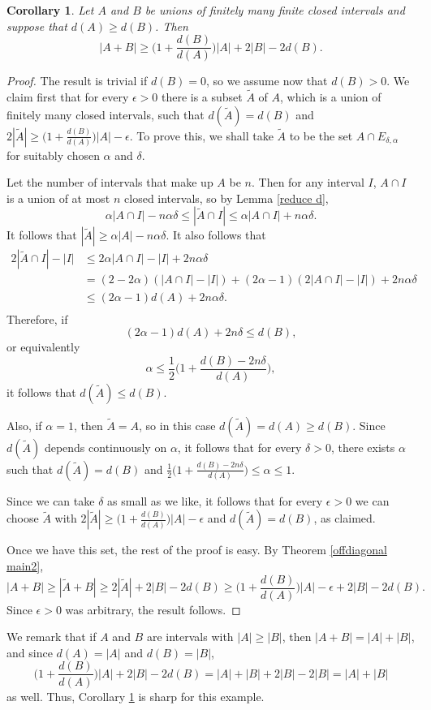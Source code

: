 \documentclass[11pt,reqno]{amsart}
\newtheorem{corollary}[theorem]{Corollary}
\theoremstyle{definition}
\def\e{\epsilon}
\def\a{\alpha}
\def\d{\delta}
\begin{document}
\begin{corollary} \label{different discrepancies}
    Let $A$ and $B$ be unions of finitely many finite closed intervals and suppose that $d(A)\geq d(B)$. Then
    \[|A+B|\geq\Big(1+\frac{d(B)}{d(A)}\Big)|A|+2|B|-2d(B).\]
\end{corollary}

\begin{proof}
The result is trivial if $d(B)=0$, so we assume now that $d(B)>0$. We claim first that for every $\e>0$ there is a subset $\tilde A$ of $A$, which is a union of finitely many closed intervals, such that $d(\tilde A)=d(B)$ and $2|\tilde A|\geq\big(1+\frac{d(B)}{d(A)}\big)|A|-\e$. To prove this, we shall take $\tilde A$ to be the set $A\cap E_{\d,\a}$ for suitably chosen $\a$ and $\d$. 

Let the number of intervals that make up $A$ be $n$. Then for any interval $I$, $A\cap I$ is a union of at most $n$ closed intervals, so by Lemma \ref{reduce d},
\[\a|A\cap I|-n\a\d\leq|\tilde A\cap I|\leq\a|A\cap I|+n\a\d.\]
It follows that $|\tilde A|\geq\a|A|-n\a\d$. It also follows that
\begin{align*}
2|\tilde A\cap I|-|I|&\leq 2\a|A\cap I|-|I|+2n\a\d\\
&=(2-2\a)(|A\cap I|-|I|)+(2\a-1)(2|A\cap I|-|I|)+2n\a\d\\
&\leq (2\a-1)d(A)+2n\a\d.\\
\end{align*}
Therefore, if
\[(2\a-1)d(A)+2n\d\leq d(B),\]
or equivalently 
\[\a\leq\frac 12\Big(1+\frac{d(B)-2n\d}{d(A)}\Big),\]
it follows that $d(\tilde A)\leq d(B)$.

Also, if $\a=1$, then $\tilde A=A$, so in this case $d(\tilde A)=d(A)\geq d(B)$. Since $d(\tilde A)$ depends continuously on $\a$, it follows that for every $\d>0$, there exists $\a$ such that $d(\tilde A)=d(B)$ and $\frac 12\Big(1+\frac{d(B)-2n\d}{d(A)}\Big)\leq\a\leq 1$.

Since we can take $\d$ as small as we like, it follows that for every $\e>0$ we can choose $\tilde A$ with $2|\tilde A|\geq \Big(1+\frac{d(B)}{d(A)}\Big)|A|-\e$ and $d(\tilde A)=d(B)$, as claimed.

Once we have this set, the rest of the proof is easy. By Theorem \ref{offdiagonal main2}, 
\[|A+B|\geq|\tilde A+B|\geq 2|\tilde A|+2|B|-2d(B)\geq\Big(1+\frac{d(B)}{d(A)}\Big)|A|-\e+2|B|-2d(B).\]
Since $\e>0$ was arbitrary, the result follows.
\end{proof}

We remark that if $A$ and $B$ are intervals with $|A|\geq|B|$, then $|A+B|=|A|+|B|$, and since $d(A)=|A|$ and $d(B)=|B|$,
\[\Big(1+\frac{d(B)}{d(A)}\Big)|A|+2|B|-2d(B)=|A|+|B|+2|B|-2|B|=|A|+|B|\]
as well. Thus, Corollary \ref{different discrepancies} is sharp for this example. 
\end{document}
